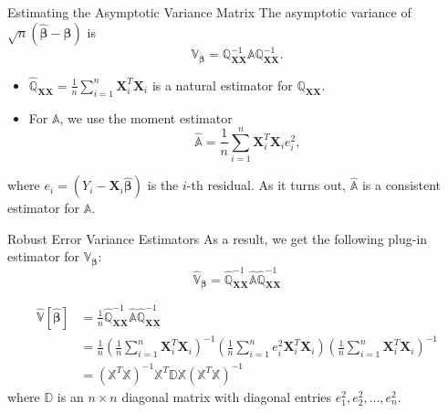\documentclass[12pt, block=fill]{beamer}
\renewcommand{\v}[1]{\pmb{#1}}
\newcommand{\m}[1]{\mathbb{#1}}
\begin{document}
\begin{frame}{Estimating the Asymptotic Variance Matrix}
The asymptotic variance of $\sqrt{n}(\widehat{\v{\beta}}-\v{\beta})$ is
$$\m{V}_{\v{\beta}}=\m{Q}_{\v{XX}}^{-1}\m{A}\m{Q}_{\v{XX}}^{-1}.$$

\begin{itemize}
\item $\widehat{\m{Q}}_{\v{XX}}=\frac{1}{n}\sum\limits_{i=1}^n\v{X}_i^T\v{X}_i$ is a natural estimator for $\m{Q}_{\v{XX}}$. 
\item For $\m{A}$, we use the moment estimator
$$
\widehat{\m{A}}=\frac{1}{n}\sum\limits_{i=1}^n\v{X}_i^T\v{X}_ie_i^2,
$$
\end{itemize}
where $e_i=(Y_i-\v{X}_i\widehat{\v{\beta}})$ is the $i$-th residual. As it turns out, $\widehat{\m{A}}$ is a consistent estimator
for $\m{A}$.
\end{frame}

\begin{frame}{Robust Error Variance Estimators}
As a result, we get the following plug-in estimator for $\m{V}_{\v{\beta}}$:
$$
\widehat{\m{V}}_{\v{\beta}}=
\widehat{\m{Q}}_{\v{XX}}^{-1}\widehat{\m{A}}\widehat{\m{Q}}_{\v{XX}}^{-1}
$$

$$
\begin{aligned}
\widehat{\m{V}}\left[\widehat{\v{\beta}}\right]
&=\frac{1}{n}\widehat{\m{Q}}_{\v{XX}}^{-1}\widehat{\m{A}}\widehat{\m{Q}}_{\v{XX}}^{-1} \\
&=\frac{1}{n}\left(\frac{1}{n}\sum\limits_{i=1}^n\v{X}_i^T\v{X}_i\right)^{-1}
\left(\frac{1}{n}\sum\limits_{i=1}^ne_i^2\v{X}_i^T\v{X}_i\right)
\left(\frac{1}{n}\sum\limits_{i=1}^n\v{X}_i^T\v{X}_i\right)^{-1} \\
&=\left(\m{X}^T\m{X}\right)^{-1}
\m{X}^T\m{D}\m{X}
\left(\m{X}^T\m{X}\right)^{-1}
\end{aligned}
$$
where $\m{D}$ is an $n\times n$ diagonal matrix with diagonal entries $e_1^2,e_2^2,\ldots,e_n^2$.
\end{frame}
\end{document}
